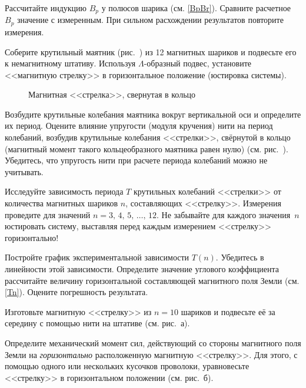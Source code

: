 \begin{lab:task}
\item Рассчитайте индукцию $B_p$ у полюсов шарика (см. \eqref{BpBr}). 
Сравните расчетное~$B_p$ значение с измеренным. 
При сильном расхождении результатов повторите измерения.


\item Соберите крутильный маятник (рис.~) из 12 магнитных шариков
и подвесьте его к немагнитному штативу.
Используя $\Lambda$-образный подвес, установите <<магнитную стрелку>>
 в горизонтальное положение (юстировка системы). 

\begin{figure}[h!]
   \centering
   \caption{Магнитная <<стрелка>>, свернутая в кольцо}       
\end{figure}

\item Возбудите крутильные колебания маятника вокруг вертикальной оси 
и определите их период. Оцените влияние упругости (модуля кручения) нити на период колебаний, 
возбудив крутильные колебания <<стрелки>>, свёрнутой в кольцо 
(магнитный момент такого кольцеобразного маятника равен нулю) 
(см. рис.~). Убедитесь, что упругость нити при расчете 
периода колебаний можно не учитывать.

\item Исследуйте зависимость периода $T$ крутильных колебаний <<стрелки>> 
от количества магнитных шариков $n$, составляющих <<стрелку>>. Измерения
проведите для значений  $n=3,\,4,\,5,\,\dots,\,12$. Не забывайте для каждого
значения~$n$ юстировать систему, выставляя перед каждым измерением <<стрелку>>
горизонтально!

\item Постройте график экспериментальной зависимости $T(n)$.
Убедитесь в линейности этой зависимости. 
Определите значение углового коэффициента рассчитайте величину горизонтальной
составляющей магнитного поля Земли (см. \eqref{Tn}).  
Оцените погрешность результата.


\item Изготовьте магнитную <<стрелку>> из $n=10$ шариков 
и подвесьте её за середину с помощью нити на штативе (см. рис.~а).
 
\item Определите механический момент сил, действующий со стороны магнитного поля
Земли на \emph{горизонтально} расположенную магнитную <<стрелку>>. 
Для этого, с помощью одного или нескольких кусочков проволоки, 
уравновесьте <<стрелку>> в горизонтальном положении
(см. рис.~б). 


\end{lab:task}
